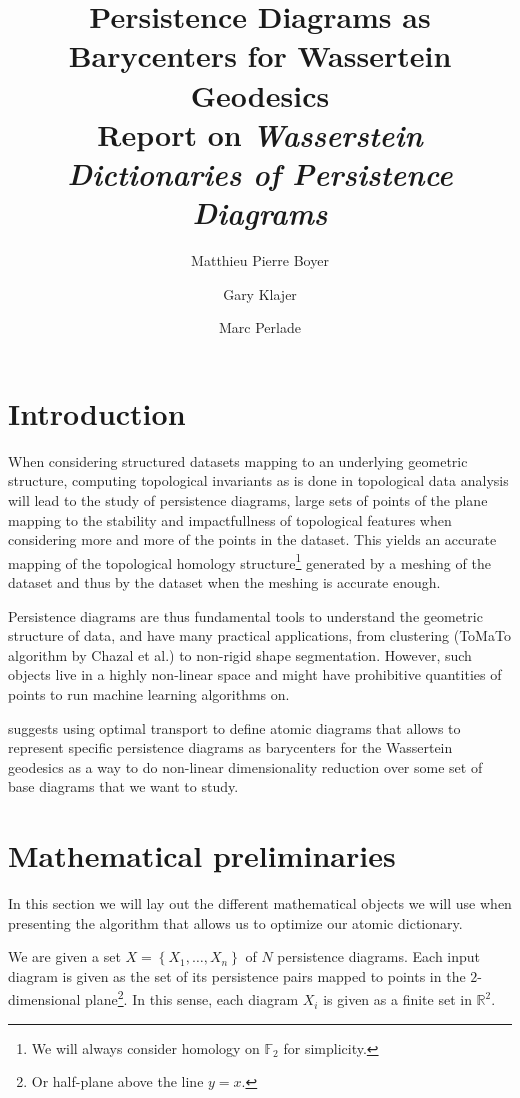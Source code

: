\documentclass[sigconf,nonacm]{acmart}
\title{Persistence Diagrams as Barycenters for Wassertein Geodesics\\{\small Report on \textit{Wasserstein 
      Dictionaries of Persistence Diagrams}}}
\author{Matthieu Pierre Boyer}
\affiliation{%
	\institution{École Normale Supérieure}
	\city{Paris}
	\country{France}}
\author{Gary Klajer}
\affiliation{%
	\institution{ÉNS Paris-Saclay}
	\city{Gif-sur-Yvette}
	\country{France}}
\author{Marc Perlade}
\affiliation{%
	\institution{École Normale Supérieure}
	\city{Paris}
	\country{France}}
\begin{document}
\maketitle

\section*{Introduction}
When considering structured datasets mapping to an underlying geometric structure, computing topological
invariants as is done in topological data analysis will lead to the study of persistence diagrams,
large sets of points of the plane mapping to the stability and impactfullness of topological features
when considering more and more of the points in the dataset.
This yields an accurate mapping of the topological homology structure\footnote{We will always consider
	homology on $\mathbb{F}_{2}$ for simplicity.} generated by a meshing of the dataset and thus by the
dataset when the meshing is accurate enough.

Persistence diagrams are thus fundamental tools to understand the geometric structure of data, and have
many practical applications, from clustering (ToMaTo algorithm by Chazal et al.) to non-rigid shape
segmentation. %
However, such objects live in a highly non-linear space and might have prohibitive quantities of points
to run machine learning algorithms on.

\cite{sisouk2023wassersteindictionariespersistencediagrams} suggests using optimal transport to define
atomic diagrams that allows to represent specific persistence diagrams as barycenters for the Wassertein
geodesics as a way to do non-linear dimensionality reduction over some set of base diagrams that we want to
study.


\section{Mathematical preliminaries}
In this section we will lay out the different mathematical objects we will use when
presenting the algorithm that allows us to optimize our atomic dictionary.

We are given a set $X = \left\{X_{1}, \ldots, X_{n}\right\}$ of $N$ persistence diagrams.
Each input diagram is given as the set of its persistence pairs mapped to points in the $2$-dimensional
plane\footnote{Or half-plane above the line $y = x$.}.
In this sense, each diagram $X_{i}$ is given as a finite set in
$\mathbb{R}^{2}$.
\end{document}
